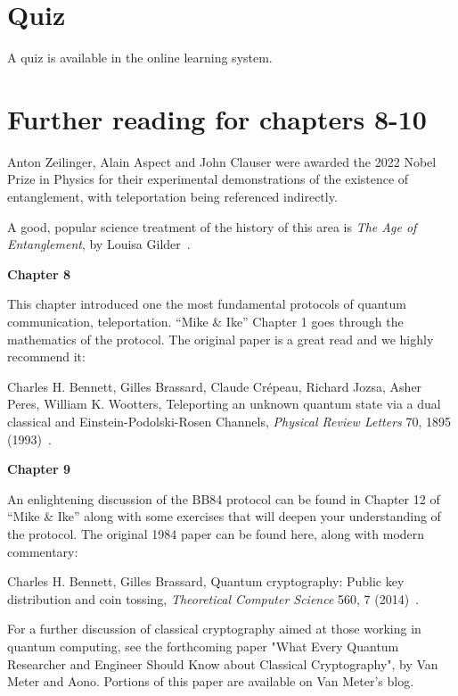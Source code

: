\newpage
\section*{Quiz}

A quiz is available in the online learning system.


\section*{Further reading for chapters 8-10}

Anton Zeilinger, Alain Aspect and John Clauser were awarded the 2022 Nobel Prize in Physics for their experimental demonstrations of the existence of entanglement, with teleportation being referenced indirectly.

A good, popular science treatment of the history of this area is \emph{The Age of Entanglement}, by Louisa Gilder~\cite{gilder08:_age_of_entanglement}.

{\bf Chapter 8}

This chapter introduced one the most fundamental protocols of quantum communication, teleportation. “Mike \& Ike” Chapter 1 goes through the mathematics of the protocol. The original paper is a great read and we highly recommend it:

Charles H. Bennett, Gilles Brassard, Claude Crépeau, Richard Jozsa, Asher Peres, William K. Wootters, Teleporting an unknown quantum state via a dual classical and Einstein-Podolski-Rosen Channels, \emph{Physical Review Letters} 70, 1895 (1993)~\cite{bennett:teleportation}.

{\bf Chapter 9}

An enlightening discussion of the BB84 protocol can be found in Chapter 12 of “Mike \& Ike” along with some exercises that will deepen your understanding of the protocol.
The original 1984 paper can be found here, along with modern commentary:

Charles H. Bennett, Gilles Brassard, Quantum cryptography: Public key distribution and coin tossing, \emph{Theoretical Computer Science} 560, 7 (2014)~\cite{bennett:bb84}.

For a further discussion of classical cryptography aimed at those working in quantum computing, see the forthcoming paper "What Every Quantum Researcher and Engineer Should Know about Classical Cryptography", by Van Meter and Aono.  Portions of this paper are available on Van Meter's blog.

